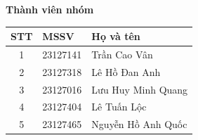 \documentclass[12pt,a4paper]{article}
\begin{document}
\begin{titlepage}
  \vspace{0.5cm}

  {\Large\bfseries Thành viên nhóm}\par
  \vspace{0.2cm}

  \small
  \begin{tabular}{@{}cll@{}}
    \toprule
    \textbf{STT} & \textbf{MSSV} & \textbf{Họ và tên} \\
    \midrule
    1 & 23127141 & Trần Cao Vân \\
    2 & 23127318 & Lê Hồ Đan Anh \\
    3 & 23127016 & Lưu Huy Minh Quang \\
    4 & 23127404 & Lê Tuấn Lộc \\
    5 & 23127465 & Nguyễn Hồ Anh Quốc \\
    \bottomrule
  \end{tabular}\par
  \normalsize

\end{titlepage}

\newpage
{}
\tableofcontents
\newpage






\end{document}
